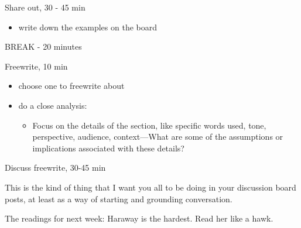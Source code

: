 \documentclass[11pt]{article}
\begin{document}
Share out, 30 - 45 min
\begin{itemize}
\item write down the examples on the board
\end{itemize}

BREAK - 20 minutes

Freewrite, 10 min
\begin{itemize}
\item choose one to freewrite about
\item do a close analysis:
\begin{itemize}
\item Focus on the details of the section, like specific words used,
tone, perspective, audience, context---What are some of the
assumptions or implications associated with these details?
\end{itemize}
\end{itemize}

Discuss freewrite, 30-45 min

This is the kind of thing that I want you all to be doing in your
discussion board posts, at least as a way of starting and grounding
conversation. 

The readings for next week: Haraway is the hardest. Read her like a
hawk. 
\end{document}
